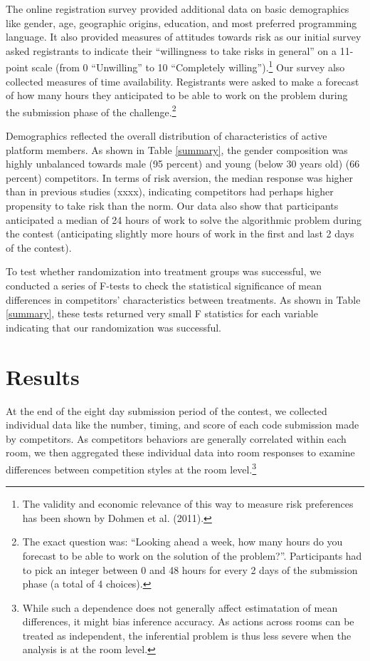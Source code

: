 \documentclass[10pt, titlepage]{article}
\begin{document}
The online registration survey provided additional data on basic
demographics like gender, age, geographic origins, education, and most
preferred programming language. It also provided measures of attitudes
towards risk as our initial survey asked registrants to indicate their
``willingness to take risks in general'' on a 11-point scale (from 0
``Unwilling'' to 10 ``Completely willing'').\footnote{The validity and
  economic relevance of this way to measure risk preferences has been
  shown by Dohmen et al. (2011).} Our survey also collected measures of
time availability. Registrants were asked to make a forecast of how many
hours they anticipated to be able to work on the problem during the
submission phase of the challenge.\footnote{The exact question was:
  ``Looking ahead a week, how many hours do you forecast to be able to
  work on the solution of the problem?''. Participants had to pick an
  integer between 0 and 48 hours for every 2 days of the submission
  phase (a total of 4 choices).}

Demographics reflected the overall distribution of characteristics of
active platform members. As shown in Table \ref{summary}, the gender
composition was highly unbalanced towards male (95 percent) and young
(below 30 years old) (66 percent) competitors. In terms of risk
aversion, the median response was higher than in previous studies
(xxxx), indicating competitors had perhaps higher propensity to take
risk than the norm. Our data also show that participants anticipated a
median of 24 hours of work to solve the algorithmic problem during the
contest (anticipating slightly more hours of work in the first and last
2 days of the contest).

To test whether randomization into treatment groups was successful, we
conducted a series of F-tests to check the statistical significance of
mean differences in competitors' characteristics between treatments. As
shown in Table \ref{summary}, these tests returned very small F
statistics for each variable indicating that our randomization was
successful.

\section{Results}\label{results}

At the end of the eight day submission period of the contest, we
collected individual data like the number, timing, and score of each
code submission made by competitors. As competitors behaviors are
generally correlated within each room, we then aggregated these
individual data into room responses to examine differences between
competition styles at the room level.\footnote{While such a dependence
  does not generally affect estimatation of mean differences, it might
  bias inference accuracy. As actions across rooms can be treated as
  independent, the inferential problem is thus less severe when the
  analysis is at the room level.}
\end{document}

